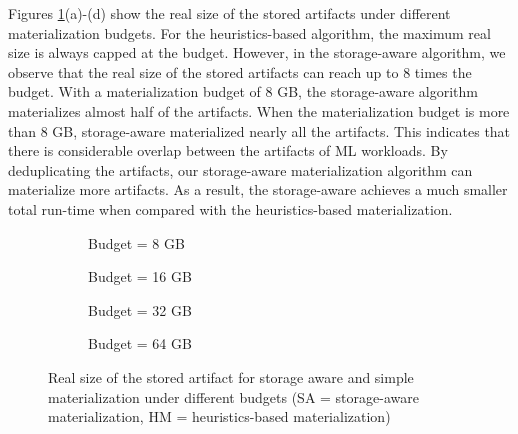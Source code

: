 Figures \ref{exp-sa-vs-simple-size}(a)-(d) show the real size of the stored artifacts under different materialization budgets.
For the heuristics-based algorithm, the maximum real size is always capped at the budget.
However, in the storage-aware algorithm, we observe that the real size of the stored artifacts can reach up to 8 times the budget.
With a materialization budget of 8 GB, the storage-aware algorithm materializes almost half of the artifacts.
When the materialization budget is more than 8 GB, storage-aware materialized nearly all the artifacts.
This indicates that there is considerable overlap between the artifacts of ML workloads.
By deduplicating the artifacts, our storage-aware materialization algorithm can materialize more artifacts.
As a result, the storage-aware achieves a much smaller total run-time when compared with the heuristics-based materialization.

\begin{figure}
\begin{subfigure}[b]{0.5\linewidth}
\centering
 \resizebox{\columnwidth}{!}{%
%
}
\caption{Budget = 8 GB}
\end{subfigure}%
\begin{subfigure}[b]{0.5\linewidth}
\centering
 \resizebox{\columnwidth}{!}{%
%
}

\caption{Budget = 16 GB}
\end{subfigure}
\begin{subfigure}[b]{0.5\linewidth}
\centering
 \resizebox{\columnwidth}{!}{%
%
}

\caption{Budget = 32 GB}
\end{subfigure}%
\begin{subfigure}[b]{0.5\linewidth}
\centering
 \resizebox{\columnwidth}{!}{%
%
}
\caption{Budget = 64 GB}
\end{subfigure}
\caption{Real size of the stored artifact for storage aware and simple materialization under different budgets (SA = storage-aware materialization, HM = heuristics-based materialization)  }
\label{exp-sa-vs-simple-size}
\end{figure}

